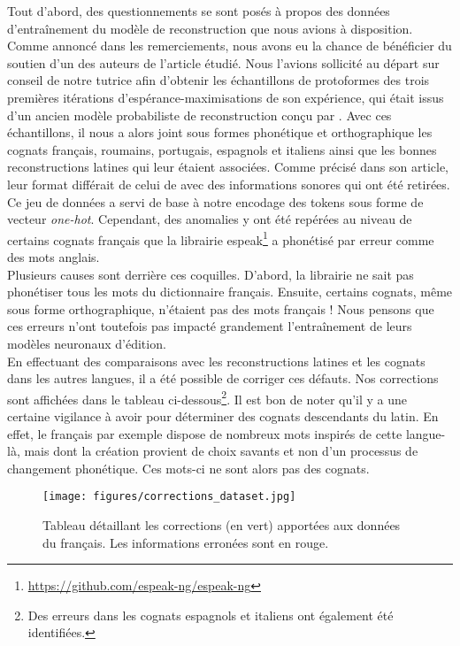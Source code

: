 \documentclass[12pt, twoside]{report}
\begin{document}
\vspace{12pt}
Tout d'abord, des questionnements se sont posés à propos des données d'entraînement du modèle de reconstruction que nous avions à disposition. Comme annoncé dans les remerciements, nous avons eu la chance de bénéficier du soutien d'un des auteurs de l'article étudié. Nous l'avions sollicité au départ sur conseil de notre tutrice afin d'obtenir les échantillons de \glspl{protoforme} des trois premières itérations d'espérance-maximisations de son expérience, qui était issus d'un ancien modèle probabiliste de reconstruction conçu par \cite{bouchard}. Avec ces échantillons, il nous a alors joint sous formes phonétique et orthographique les \glspl{cognat} français, roumains, portugais, espagnols et italiens ainsi que les bonnes reconstructions latines qui leur étaient associées. Comme précisé dans son article, leur format différait de celui de \cite{meloni-etal-2021-ab} avec des informations sonores qui ont été retirées. Ce jeu de données a servi de base à notre encodage des tokens sous forme de vecteur \textit{one-hot}. Cependant, des anomalies y ont été repérées au niveau de certains \glspl{cognat} français que la librairie espeak\footnote{\url{https://github.com/espeak-ng/espeak-ng}} a phonétisé par erreur comme des mots anglais.\\
Plusieurs causes sont derrière ces coquilles. D'abord, la librairie ne sait pas phonétiser tous les mots du dictionnaire français. Ensuite, certains \glspl{cognat}, même sous forme orthographique, n'étaient pas des mots français ! Nous pensons que ces erreurs n'ont toutefois pas impacté grandement l'entraînement de leurs modèles neuronaux d'édition. \\
En effectuant des comparaisons avec les reconstructions latines et les \glspl{cognat} dans les autres langues, il a été possible de corriger ces défauts. Nos corrections sont affichées dans le tableau ci-dessous\footnote{Des erreurs dans les \glspl{cognat} espagnols et italiens ont également été identifiées.}. Il est bon de noter qu'il y a une certaine vigilance à avoir pour déterminer des \glspl{cognat} descendants du latin. En effet, le français par exemple dispose de nombreux mots inspirés de cette langue-là, mais dont la création provient de choix savants et non d'un processus de changement phonétique. Ces mots-ci ne sont alors pas des \glspl{cognat}.

\begin{figure}[!h]
    \centering
    \texttt{[image: figures/corrections\_dataset.jpg]}
    \caption{Tableau détaillant les corrections (en vert) apportées aux données du français. Les informations erronées sont en rouge.}
\end{figure}
\end{document}
